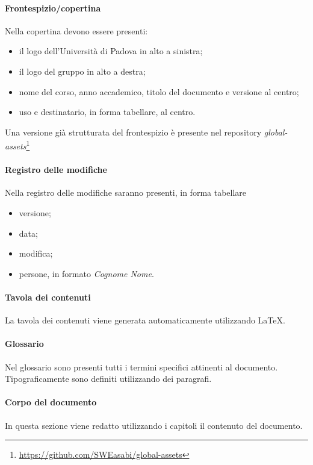 \paragraph{Frontespizio/copertina} Nella copertina devono essere presenti:
\begin{itemize}
    \item il logo dell'Università di Padova in alto a sinistra;
    \item il logo del gruppo in alto a destra;
    \item nome del corso, anno accademico, titolo del documento e versione al centro;
    \item uso e destinatario, in forma tabellare, al centro.
\end{itemize}
Una versione già strutturata del frontespizio è presente nel repository \textit{global-assets}\footnote{\href{https://github.com/SWEasabi/global-assets}{https://github.com/SWEasabi/global-assets}}

\paragraph{Registro delle modifiche} Nella registro delle modifiche saranno presenti, in forma tabellare
\begin{itemize}
    \item versione;
    \item data;
    \item modifica;
    \item persone, in formato \textit{Cognome Nome}.
\end{itemize}

\paragraph{Tavola dei contenuti} La tavola dei contenuti viene generata automaticamente utilizzando \LaTeX.

\paragraph{Glossario} Nel glossario sono presenti tutti i termini specifici attinenti al documento. Tipograficamente sono definiti utilizzando dei paragrafi.

\paragraph{Corpo del documento} In questa sezione viene redatto utilizzando i capitoli il contenuto del documento.

